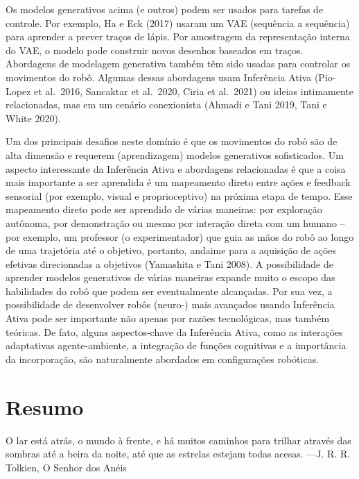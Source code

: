 \documentclass[
  12pt,
]{book}
\begin{document}
Os modelos generativos acima (e outros) podem ser usados para tarefas de controle. Por exemplo, Ha e Eck (2017) usaram um VAE (sequência a sequência) para aprender a prever traços de lápis. Por amostragem da representação interna do VAE, o modelo pode construir novos desenhos baseados em traços. Abordagens de modelagem generativa também têm sido usadas para controlar os movimentos do robô. Algumas dessas abordagens usam Inferência Ativa (Pio-Lopez et al.~2016, Sancaktar et al.~2020, Ciria et al.~2021) ou ideias intimamente relacionadas, mas em um cenário conexionista (Ahmadi e Tani 2019, Tani e White 2020).

Um dos principais desafios neste domínio é que os movimentos do robô são de alta dimensão e requerem (aprendizagem) modelos generativos sofisticados. Um aspecto interessante da Inferência Ativa e abordagens relacionadas é que a coisa mais importante a ser aprendida é um mapeamento direto entre ações e feedback sensorial (por exemplo, visual e proprioceptivo) na próxima etapa de tempo. Esse mapeamento direto pode ser aprendido de várias maneiras: por exploração autônoma, por demonstração ou mesmo por interação direta com um humano -- por exemplo, um professor (o experimentador) que guia as mãos do robô ao longo de uma trajetória até o objetivo, portanto, andaime para a aquisição de ações efetivas direcionadas a objetivos (Yamashita e Tani 2008). A possibilidade de aprender modelos generativos de várias maneiras expande muito o escopo das habilidades do robô que podem ser eventualmente alcançadas. Por sua vez, a possibilidade de desenvolver robôs (neuro-) mais avançados usando Inferência Ativa pode ser importante não apenas por razões tecnológicas, mas também teóricas. De fato, alguns aspectos-chave da Inferência Ativa, como as interações adaptativas agente-ambiente, a integração de funções cognitivas e a importância da incorporação, são naturalmente abordados em configurações robóticas.

\hypertarget{resumo-9}{%
\section{Resumo}\label{resumo-9}}

O lar está atrás, o mundo à frente, e há muitos caminhos para trilhar através das sombras até a beira da noite, até que as estrelas estejam todas acesas.
---J. R. R. Tolkien, O Senhor dos Anéis
\end{document}
